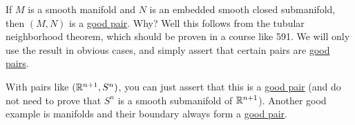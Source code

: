 \begin{remark}
	If $M$ is a smooth manifold and $N$ is an embedded smooth closed submanifold, then $(M, N)$ is a \hyperref[def:good-pair]{good pair}. Why? Well this
	follows from the tubular neighborhood theorem, which should be proven in a course like 591. We will only use the result in obvious cases, and simply
	assert that certain pairs are \hyperref[def:good-pair]{good pairs}.
\end{remark}

With pairs like $(\mathbb{\MakeUppercase{r}}^{n + 1}, S^n)$, you can just assert that this is a \hyperref[def:good-pair]{good pair} (and do not need to
prove that $S^n$ is a smooth submanifold of $\mathbb{\MakeUppercase{r}}^{n + 1}$). Another good example is manifolds and their boundary always form a \hyperref[def:good-pair]{good pair}.

